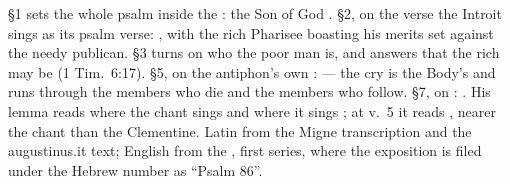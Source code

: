 \begin{witnessnote}
\S1 sets the whole psalm inside the : the Son of God
. \S2, on the
verse the Introit sings as its psalm verse: , with the rich Pharisee boasting his merits
set against the needy publican. \S3 turns on who the poor man is, and answers
that the rich may be  (1 Tim.~6:17). \S5, on the
antiphon's own :  --- the
cry is the Body's and runs through the members who die and the members who
follow. \S7, on : . His lemma reads  where the chant sings
 and  where it sings
; at v.~5 it reads ,
nearer the chant than the Clementine. Latin from the Migne transcription and the
augustinus.it text; English from the , first
series, where the exposition is filed under the Hebrew number as ``Psalm 86''.
\end{witnessnote}

